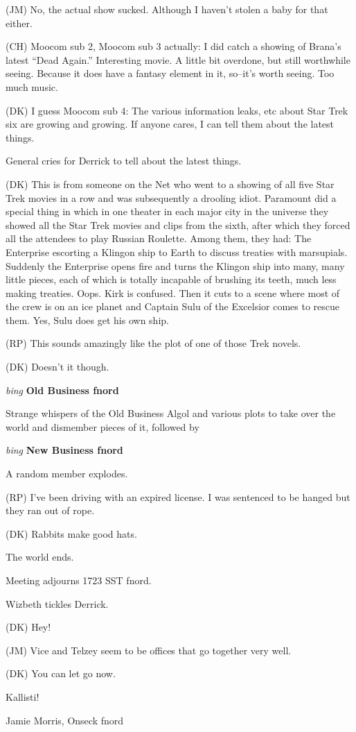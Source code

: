 (JM) No, the actual show sucked.  Although I haven't stolen a baby
for that either.

(CH) Moocom sub 2, Moocom sub 3 actually:  I did catch a showing of
Brana's latest ``Dead Again.''  Interesting movie.  A little bit
overdone, but still worthwhile seeing.  Because it does have a fantasy
element in it, so--it's worth seeing.  Too much music.

(DK) I guess Moocom sub 4:  The various information leaks, etc about
Star Trek six are growing and growing.  If anyone cares, I can tell them
about the latest things.

General cries for Derrick to tell about the latest things.

(DK) This is from someone on the Net who went to a showing of all
five Star Trek movies in a row and was subsequently a drooling idiot.
Paramount did a special thing in which in one theater in each major
city in the universe they showed all the Star Trek movies and clips
from the sixth, after which they forced all the attendees to play
Russian Roulette.  Among them, they had:  The Enterprise escorting
a Klingon ship to Earth to discuss treaties with marsupials.  Suddenly
the Enterprise opens fire and turns the Klingon ship into many, many
little pieces, each of which is totally incapable of brushing its
teeth, much less making treaties.  Oops.  Kirk is confused.
Then it cuts to a scene where most of the crew is on an ice planet
and Captain Sulu of the Excelsior comes to rescue them.  Yes, Sulu
does get his own ship.

(RP) This sounds amazingly like the plot of one of those Trek novels.

(DK) Doesn't it though.

\vspace{0.15in}
{\em bing\/} {\bf Old Business fnord\/}

Strange whispers of the Old Business Algol and various plots
to take over the world and dismember pieces of it, followed by

\vspace{0.15in}
{\em bing\/} {\bf New Business fnord\/}

A random member explodes.

(RP) I've been driving with an expired license.  I was sentenced
to be hanged but they ran out of rope.

(DK) Rabbits make good hats.

The world ends.

Meeting adjourns 1723 SST fnord.

Wizbeth tickles Derrick.

(DK) Hey!

(JM) Vice and Telzey seem to be offices that go together very well.

(DK) You can let go now.

\vspace{0.15in}
\begin{center}
Kallisti!

Jamie Morris, Onseck fnord
\end{center}

